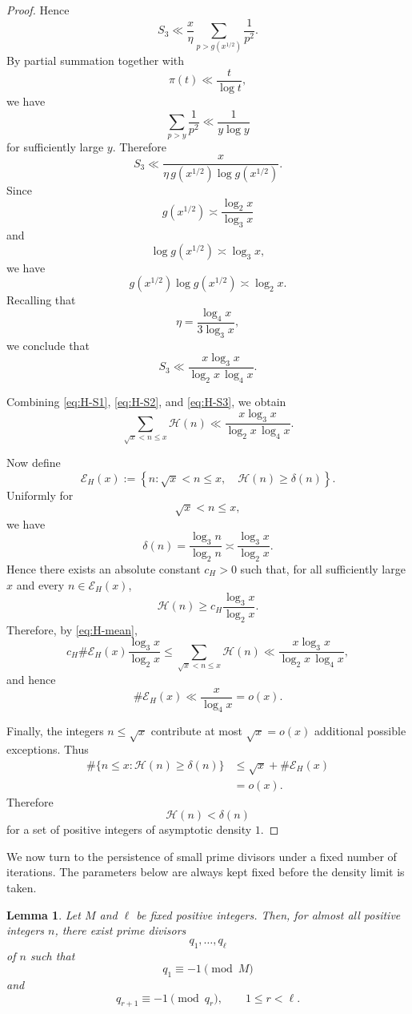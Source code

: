 \documentclass{article}
\newtheorem{lemma}{Lemma}
\begin{document}
\begin{proof}
Hence
\[
S_3
\ll
\frac{x}{\eta}
\sum_{p>g(x^{1/2})}\frac1{p^2}.
\]
By partial summation together with
\[
\pi(t)\ll\frac{t}{\log t},
\]
we have
\[
\sum_{p>y}\frac1{p^2}
\ll
\frac1{y\log y}
\]
for sufficiently large $y$. Therefore
\[
S_3
\ll
\frac{x}
{\eta\,g(x^{1/2})
\log g(x^{1/2})}.
\]
Since
\[
g(x^{1/2})
\asymp
\frac{\log_2x}{\log_3x}
\]
and
\[
\log g(x^{1/2})
\asymp
\log_3x,
\]
we have
\[
g(x^{1/2})
\log g(x^{1/2})
\asymp
\log_2x.
\]
Recalling that
\[
\eta
=
\frac{\log_4x}{3\log_3x},
\]
we conclude that
\begin{equation}
S_3
\ll
\frac{x\log_3x}
{\log_2x\,\log_4x}.
\label{eq:H-S3}
\end{equation}

Combining
\eqref{eq:H-S1},
\eqref{eq:H-S2}, and
\eqref{eq:H-S3}, we obtain
\begin{equation}
\sum_{\sqrt{x}<n\le x}\mathcal H(n)
\ll
\frac{x\log_3x}
{\log_2x\,\log_4x}.
\label{eq:H-mean}
\end{equation}

Now define
\[
\mathcal E_H(x)
:=
\left\{
n:
\sqrt{x}<n\le x,\quad
\mathcal H(n)\ge\delta(n)
\right\}.
\]
Uniformly for
\[
\sqrt{x}<n\le x,
\]
we have
\[
\delta(n)
=
\frac{\log_3n}{\log_2n}
\asymp
\frac{\log_3x}{\log_2x}.
\]
Hence there exists an absolute constant $c_H>0$ such that, for all
sufficiently large $x$ and every $n\in\mathcal E_H(x)$,
\[
\mathcal H(n)
\ge
c_H
\frac{\log_3x}{\log_2x}.
\]
Therefore, by \eqref{eq:H-mean},
\[
c_H
\#\mathcal E_H(x)
\frac{\log_3x}{\log_2x}
\le
\sum_{\sqrt{x}<n\le x}\mathcal H(n)
\ll
\frac{x\log_3x}
{\log_2x\,\log_4x},
\]
and hence
\[
\#\mathcal E_H(x)
\ll
\frac{x}{\log_4x}
=
o(x).
\]

Finally, the integers $n\le\sqrt{x}$ contribute at most
$\sqrt{x}=o(x)$ additional possible exceptions. Thus
\[
\begin{aligned}
\#\{n\le x:\mathcal H(n)\ge\delta(n)\}
&\le
\sqrt{x}
+
\#\mathcal E_H(x)\\
&=
o(x).
\end{aligned}
\]
Therefore
\[
\mathcal H(n)<\delta(n)
\]
for a set of positive integers of asymptotic density $1$.
\end{proof}


We now turn to the persistence of small prime divisors under a fixed
number of iterations. The parameters below are always kept fixed
before the density limit is taken.

\begin{lemma}\label{lem:prime-chain}
Let $M$ and $\ell$ be fixed positive integers. Then, for almost all
positive integers $n$, there exist prime divisors
\[
q_1,\ldots,q_\ell
\]
of $n$ such that
\[
q_1\equiv-1\pmod M
\]
and
\[
q_{r+1}\equiv-1\pmod{q_r},
\qquad
1\le r<\ell.
\]
\end{lemma}
\end{document}
